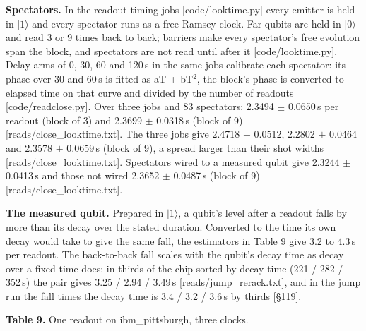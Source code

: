 \documentclass[11pt]{article}
\begin{document}
\textbf{Spectators.} In the readout-timing jobs {[}code/looktime.py{]} every emitter is held in \(|1\rangle\) and every spectator runs as a free Ramsey clock. Far qubits are held in \(|0\rangle\) and read 3 or 9 times back to back; barriers make every spectator's free evolution span the block, and spectators are not read until after it {[}code/looktime.py{]}. Delay arms of 0, 30, 60 and 120\,\textmu s in the same jobs calibrate each spectator: its phase over 30 and 60\,\textmu s is fitted as aT + bT\(^2\), the block's phase is converted to elapsed time on that curve and divided by the number of readouts {[}code/readclose.py{]}. Over three jobs and 83 spectators: 2.3494 \(\pm\) 0.0650\,\textmu s per readout (block of 3) and 2.3699 \(\pm\) 0.0318\,\textmu s (block of 9) {[}reads/close\_looktime.txt{]}. The three jobs give 2.4718 \(\pm\) 0.0512, 2.2802 \(\pm\) 0.0464 and 2.3578 \(\pm\) 0.0659\,\textmu s (block of 9), a spread larger than their shot widths {[}reads/close\_looktime.txt{]}. Spectators wired to a measured qubit give 2.3244 \(\pm\) 0.0413\,\textmu s and those not wired 2.3652 \(\pm\) 0.0487\,\textmu s (block of 9) {[}reads/close\_looktime.txt{]}.

\textbf{The measured qubit.} Prepared in \(|1\rangle\), a qubit's level after a readout falls by more than its decay over the stated duration. Converted to the time its own decay would take to give the same fall, the estimators in Table 9 give 3.2 to 4.3\,\textmu s per readout. The back-to-back fall scales with the qubit's decay time as decay over a fixed time does: in thirds of the chip sorted by decay time (221 / 282 / 352\,\textmu s) the pair gives 3.25 / 2.94 / 3.49\,\textmu s {[}reads/jump\_rerack.txt{]}, and in the jump run the fall times the decay time is 3.4 / 3.2 / 3.6\,\textmu s by thirds {[}\S{}119{]}.

\textbf{Table 9.} One readout on ibm\_pittsburgh, three clocks.
\end{document}
